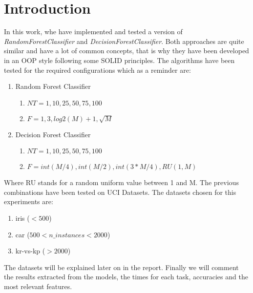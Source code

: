 \section{Introduction}

In this work, whe have implemented and tested a version of \textit{RandomForestClassifier} and \textit{DecisionForestClassifier}. Both approaches are quite similar and have a lot of common concepts, that is why they have been developed in an OOP style following some SOLID principles. The algorithms have been tested for the required configurations which as a reminder are:

\begin{enumerate}
    \item Random Forest Classifier
    \begin{enumerate}
        \item $NT = 1, 10, 25, 50, 75, 100$
        \item $F = 1, 3, log2(M)+1, \sqrt{M}$
    \end{enumerate}
    \item Decision Forest Classifier
    \begin{enumerate}
        \item $NT = 1, 10, 25, 50, 75, 100$
        \item $F = int(M/4), int(M/2), int(3*M/4), RU(1, M)$
    \end{enumerate}
\end{enumerate}

Where RU stands for a random uniform value between 1 and M. The previous combinations have been tested on UCI Datasets. The datasets chosen for this experiments are:

\begin{enumerate}
    \item iris ($< 500$)
    \item car ($500 < n\_instances < 2000$)
    \item kr-vs-kp ($> 2000$)
\end{enumerate}

The datasets will be explained later on in the report. Finally we will comment the results extracted from the models, the times for each task, accuracies and the most relevant features.